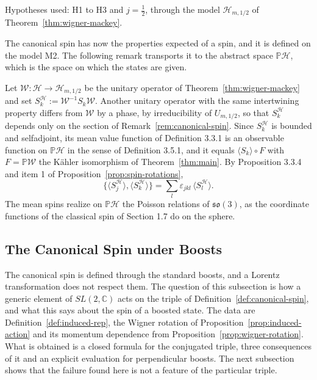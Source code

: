\noindent Hypotheses used: H1 to H3 and $j=\frac12$, through the model $\mathcal{H}_{m,1/2}$ of Theorem~\ref{thm:wigner-mackey}.

The canonical spin has now the properties expected of a spin, and it is defined on the model M2. The following remark transports it to the abstract space $\mathbb{P}\mathcal{H}$, which is the space on which the states are given.

\begin{remark}\label{rem:spin-state-space}
	Let $\mathcal{W}:\mathcal{H}\to\mathcal{H}_{m,1/2}$ be the unitary operator of Theorem~\ref{thm:wigner-mackey} and set $S_k^{\mathcal{H}}:=\mathcal{W}^{-1}S_k\mathcal{W}$. Another unitary operator with the same intertwining property differs from $\mathcal{W}$ by a phase, by irreducibility of $U_{m,1/2}$, so that $S_k^{\mathcal{H}}$ depends only on the section of Remark~\ref{rem:canonical-spin}. Since $S_k^{\mathcal{H}}$ is bounded and selfadjoint, its mean value function of Definition 3.3.1 is an observable function on $\mathbb{P}\mathcal{H}$ in the sense of Definition 3.5.1, and it equals $\langle S_k\rangle\circ F$ with $F=\mathbb{P}\mathcal{W}$ the Kähler isomorphism of Theorem~\ref{thm:main}. By Proposition 3.3.4 and item 1 of Proposition~\ref{prop:spin-rotations},
	\begin{equation*}
		\big\{\langle S_j^{\mathcal{H}}\rangle,\langle S_k^{\mathcal{H}}\rangle\big\}=\sum_l\varepsilon_{jkl}\,\langle S_l^{\mathcal{H}}\rangle.
	\end{equation*}
	The mean spins realize on $\mathbb{P}\mathcal{H}$ the Poisson relations of $\mathfrak{so}(3)$, as the coordinate functions of the classical spin of Section 1.7 do on the sphere.
\end{remark}

\subsection{The Canonical Spin under Boosts}
\label{subsec:spin-boosts}

The canonical spin is defined through the standard boosts, and a Lorentz transformation does not respect them. The question of this subsection is how a generic element of $SL(2,\mathbb{C})$ acts on the triple of Definition~\ref{def:canonical-spin}, and what this says about the spin of a boosted state. The data are Definition~\ref{def:induced-rep}, the Wigner rotation of Proposition~\ref{prop:induced-action} and its momentum dependence from Proposition~\ref{prop:wigner-rotation}. What is obtained is a closed formula for the conjugated triple, three consequences of it and an explicit evaluation for perpendicular boosts. The next subsection shows that the failure found here is not a feature of the particular triple.

